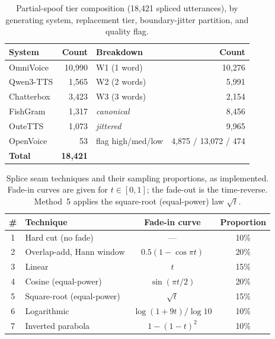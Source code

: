 \documentclass[11pt]{article}
\begin{document}
\begin{table}[t]
\centering
\caption{Partial-spoof tier composition (18{,}421 spliced utterances),
by generating system, replacement tier, boundary-jitter partition, and
quality flag.}
\label{tab:pscomp}
\small
\begin{tabular}{lr@{\hskip 1.5em}lr}
\toprule
\textbf{System} & \textbf{Count} & \textbf{Breakdown} & \textbf{Count} \\
\midrule
OmniVoice   & 10{,}990 & W1 (1 word)       & 10{,}276 \\
Qwen3-TTS   &  1{,}565 & W2 (2 words)      &  5{,}991 \\
Chatterbox  &  3{,}423 & W3 (3 words)      &  2{,}154 \\
FishGram    &  1{,}317 & \emph{canonical}  &  8{,}456 \\
OuteTTS     &  1{,}073 & \emph{jittered}   &  9{,}965 \\
OpenVoice   &     53   & flag high/med/low & 4{,}875 / 13{,}072 / 474 \\
\midrule
\textbf{Total} & \textbf{18{,}421} & & \\
\bottomrule
\end{tabular}
\end{table}

\begin{table}[t]
\centering
\caption{Splice seam techniques and their sampling
proportions, as implemented. Fade-in curves are given for
$t\in[0,1]$; the fade-out is the time-reverse. Method~5 applies the
square-root (equal-power) law $\sqrt{t}$.}
\label{tab:splice}
\small
\begin{tabular}{clcc}
\toprule
\textbf{\#} & \textbf{Technique} & \textbf{Fade-in curve} & \textbf{Proportion} \\
\midrule
1 & Hard cut (no fade)          & ---                       & 10\% \\
2 & Overlap-add, Hann window    & $0.5(1-\cos\pi t)$        & 20\% \\
3 & Linear                      & $t$                       & 15\% \\
4 & Cosine (equal-power)        & $\sin(\pi t/2)$           & 20\% \\
5 & Square-root (equal-power)   & $\sqrt{t}$                & 15\% \\
6 & Logarithmic                 & $\log(1+9t)/\log 10$      & 10\% \\
7 & Inverted parabola           & $1-(1-t)^2$               & 10\% \\
\bottomrule
\end{tabular}
\end{table}
\end{document}

